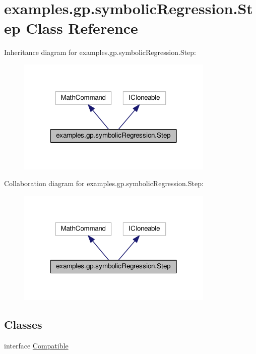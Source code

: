 \hypertarget{classexamples_1_1gp_1_1symbolic_regression_1_1_step}{\section{examples.\-gp.\-symbolic\-Regression.\-Step Class Reference}
\label{classexamples_1_1gp_1_1symbolic_regression_1_1_step}
}


Inheritance diagram for examples.\-gp.\-symbolic\-Regression.\-Step\-:
\nopagebreak
\begin{figure}[H]
\begin{center}
\leavevmode
\includegraphics[width=266pt]{classexamples_1_1gp_1_1symbolic_regression_1_1_step__inherit__graph}
\end{center}
\end{figure}


Collaboration diagram for examples.\-gp.\-symbolic\-Regression.\-Step\-:
\nopagebreak
\begin{figure}[H]
\begin{center}
\leavevmode
\includegraphics[width=266pt]{classexamples_1_1gp_1_1symbolic_regression_1_1_step__coll__graph}
\end{center}
\end{figure}
\subsection*{Classes}
\begin{DoxyCompactItemize}
\item 
interface \hyperlink{interfaceexamples_1_1gp_1_1symbolic_regression_1_1_step_1_1_compatible}{Compatible}
\end{DoxyCompactItemize}
